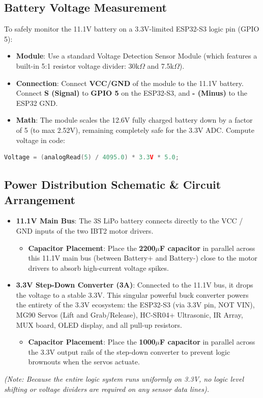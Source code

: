 \documentclass[12pt,a4paper]{article}
\begin{document}
\subsection*{Battery Voltage Measurement}
To safely monitor the 11.1V battery on a 3.3V-limited ESP32-S3 logic pin (GPIO 5):
\begin{itemize}
    \item \textbf{Module}: Use a standard Voltage Detection Sensor Module (which features a built-in 5:1 resistor voltage divider: 30k$\Omega$ and 7.5k$\Omega$).
    \item \textbf{Connection}: Connect \textbf{VCC/GND} of the module to the 11.1V battery. Connect \textbf{S (Signal)} to \textbf{GPIO 5} on the ESP32-S3, and \textbf{- (Minus)} to the ESP32 GND.
    \item \textbf{Math}: The module scales the 12.6V fully charged battery down by a factor of 5 (to max 2.52V), remaining completely safe for the 3.3V ADC. Compute voltage in code:
\end{itemize}
\begin{lstlisting}[language=C++, frame=none, backgroundcolor=\color{white}]
Voltage = (analogRead(5) / 4095.0) * 3.3V * 5.0;
\end{lstlisting}

\subsection*{Power Distribution Schematic \& Circuit Arrangement}
\begin{itemize}
    \item \textbf{11.1V Main Bus}: The 3S LiPo battery connects directly to the VCC / GND inputs of the two IBT2 motor drivers.
    \begin{itemize}
        \item \textbf{Capacitor Placement}: Place the \textbf{2200$\mu$F capacitor} in parallel across this 11.1V main bus (between Battery+ and Battery-) close to the motor drivers to absorb high-current voltage spikes.
    \end{itemize}
    \item \textbf{3.3V Step-Down Converter (3A)}: Connected to the 11.1V bus, it drops the voltage to a stable 3.3V. This singular powerful buck converter powers the entirety of the 3.3V ecosystem: the ESP32-S3 (via 3.3V pin, NOT VIN), MG90 Servos (Lift and Grab/Release), HC-SR04+ Ultrasonic, IR Array, MUX board, OLED display, and all pull-up resistors.
    \begin{itemize}
        \item \textbf{Capacitor Placement}: Place the \textbf{1000$\mu$F capacitor} in parallel across the 3.3V output rails of the step-down converter to prevent logic brownouts when the servos actuate.
    \end{itemize}
\end{itemize}
\textit{(Note: Because the entire logic system runs uniformly on 3.3V, no logic level shifting or voltage dividers are required on any sensor data lines).}
\end{document}
